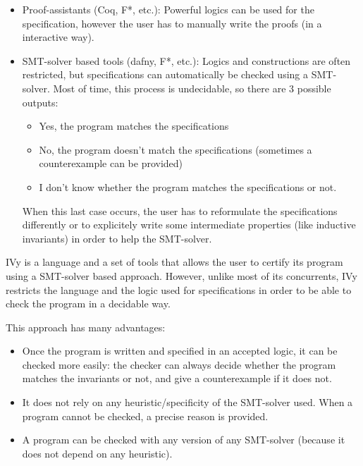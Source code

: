 \documentclass[11pt,a4paper,oldfontcommands,openany]{memoir}
\begin{document}
    \begin{itemize}
        \item Proof-assistants (Coq, F*, etc.):
        Powerful logics can be used for the specification,
        however the user has to manually write the proofs (in a interactive way).
        \item SMT-solver based tools (dafny, F*, etc.):
        Logics and constructions are often restricted, but specifications can automatically be checked using a SMT-solver.
        Most of time, this process is undecidable,
        so there are 3 possible outputs:
        \begin{itemize}
            \item Yes, the program matches the specifications
            \item No, the program doesn't match the specifications (sometimes a counterexample can be provided)
            \item I don't know whether the program matches the specifications or not.
        \end{itemize}
        When this last case occurs, the user has to reformulate the specifications differently or to explicitely write some intermediate properties (like inductive invariants)
        in order to help the SMT-solver.
    \end{itemize}

    IVy\cite{Padon:2016:ISV:2908080.2908118} is a language and a set of tools that allows the user to certify its program using a SMT-solver based approach.
    However, unlike most of its concurrents, IVy restricts the language and the logic used for specifications
    in order to be able to check the program in a decidable way.

    This approach has many advantages:
    \begin{itemize}
        \item Once the program is written and specified in an accepted logic, it can be checked more easily:
        the checker can always decide whether the program matches the invariants or not, and give a counterexample if it does not.
        \item It does not rely on any heuristic/specificity of the SMT-solver used.
        When a program cannot be checked, a precise reason is provided.
        \item A program can be checked with any version of any SMT-solver (because it does not depend on any heuristic).
    \end{itemize}
    
\end{document}
